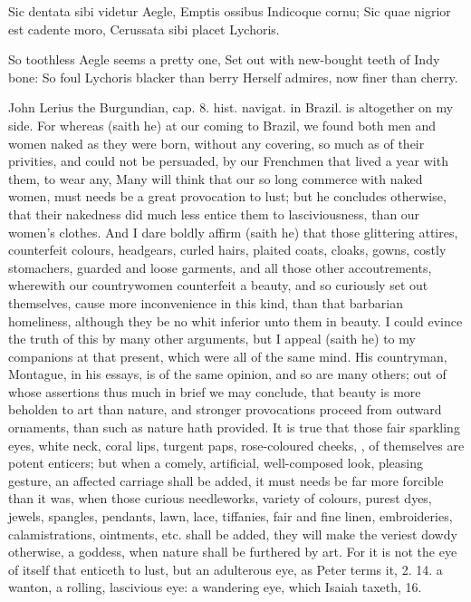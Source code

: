 {Sic dentata sibi videtur Aegle,
Emptis ossibus Indicoque cornu;
Sic quae nigrior est cadente moro,
Cerussata sibi placet Lychoris.

So toothless Aegle seems a pretty one,
Set out with new-bought teeth of Indy bone:
So foul Lychoris blacker than berry
Herself admires, now finer than cherry.

John Lerius the Burgundian, cap. 8. hist. navigat. in Brazil. is
altogether on my side. For whereas (saith he) at our coming to Brazil,
we found both men and women naked as they were born, without any
covering, so much as of their privities, and could not be persuaded, by
our Frenchmen that lived a year with them, to wear any, Many will
think that our so long commerce with naked women, must needs be a great
provocation to lust; but he concludes otherwise, that their nakedness
did much less entice them to lasciviousness, than our women's clothes.
And I dare boldly affirm (saith he) that those glittering attires,
counterfeit colours, headgears, curled hairs, plaited coats, cloaks,
gowns, costly stomachers, guarded and loose garments, and all those
other accoutrements, wherewith our countrywomen counterfeit a beauty,
and so curiously set out themselves, cause more inconvenience in this
kind, than that barbarian homeliness, although they be no whit inferior
unto them in beauty. I could evince the truth of this by many other
arguments, but I appeal (saith he) to my companions at that present,
which were all of the same mind. His countryman, Montague, in his
essays, is of the same opinion, and so are many others; out of whose
assertions thus much in brief we may conclude, that beauty is more
beholden to art than nature, and stronger provocations proceed from
outward ornaments, than such as nature hath provided. It is true that
those fair sparkling eyes, white neck, coral lips, turgent paps,
rose-coloured cheeks, \etc{}, of themselves are potent enticers; but when
a comely, artificial, well-composed look, pleasing gesture, an affected
carriage shall be added, it must needs be far more forcible than it
was, when those curious needleworks, variety of colours, purest dyes,
jewels, spangles, pendants, lawn, lace, tiffanies, fair and fine linen,
embroideries, calamistrations, ointments, etc. shall be added, they
will make the veriest dowdy otherwise, a goddess, when nature shall be
furthered by art. For it is not the eye of itself that enticeth to
lust, but an adulterous eye, as Peter terms it, 2.  14. a wanton, a
rolling, lascivious eye: a wandering eye, which Isaiah taxeth,  16.
}
